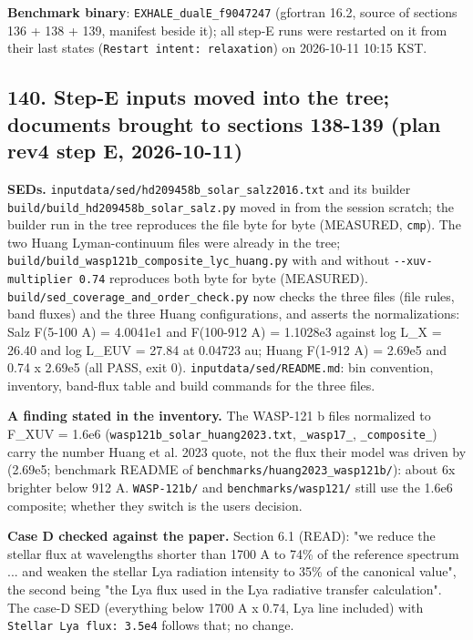\documentclass[english,a4paper]{my_memo}
\begin{document}
\textbf{Benchmark binary}: \texttt{EXHALE\_dualE\_f9047247} (gfortran 16.2, source of sections 136 + 138 + 139, manifest beside it); all step-E runs were restarted on it from their last states (\texttt{Restart\ intent:\ relaxation}) on 2026-10-11 10:15 KST.

\subsection{140. Step-E inputs moved into the tree; documents brought to sections 138-139 (plan rev4 step E, 2026-10-11)}\label{140-step-e-inputs-moved-into-the-tree-documents-brought-to-sections-138-139-plan-rev4-step-e-2026-10-11}

\textbf{SEDs.} \texttt{inputdata/sed/hd209458b\_solar\_salz2016.txt} and its builder \texttt{build/build\_hd209458b\_solar\_salz.py} moved in from the session scratch; the builder run in the tree reproduces the file byte for byte (MEASURED, \texttt{cmp}). The two Huang Lyman-continuum files were already in the tree; \texttt{build/build\_wasp121b\_composite\_lyc\_huang.py} with and without \texttt{-\/-xuv-multiplier\ 0.74} reproduces both byte for byte (MEASURED). \texttt{build/sed\_coverage\_and\_order\_check.py} now checks the three files (file rules, band fluxes) and the three Huang configurations, and asserts the normalizations: Salz F(5-100 A) = 4.0041e1 and F(100-912 A) = 1.1028e3 against log L\_X = 26.40 and log L\_EUV = 27.84 at 0.04723 au; Huang F(1-912 A) = 2.69e5 and 0.74 x 2.69e5 (all PASS, exit 0). \texttt{inputdata/sed/README.md}: bin convention, inventory, band-flux table and build commands for the three files.

\textbf{A finding stated in the inventory.} The WASP-121 b files normalized to F\_XUV = 1.6e6 (\texttt{wasp121b\_solar\_huang2023.txt}, \texttt{\_wasp17\_}, \texttt{\_composite\_}) carry the number Huang et al. 2023 quote, not the flux their model was driven by (2.69e5; benchmark README of \texttt{benchmarks/huang2023\_wasp121b/}): about 6x brighter below 912 A. \texttt{WASP-121b/} and \texttt{benchmarks/wasp121/} still use the 1.6e6 composite; whether they switch is the user\textquotesingle s decision.

\textbf{Case D checked against the paper.} Section 6.1 (READ): "we reduce the stellar flux at wavelengths shorter than 1700 A to 74\% of the reference spectrum ... and weaken the stellar Lya radiation intensity to 35\% of the canonical value", the second being "the Lya flux used in the Lya radiative transfer calculation". The case-D SED (everything below 1700 A x 0.74, Lya line included) with \texttt{Stellar\ Lya\ flux:\ 3.5e4} follows that; no change.
\end{document}
